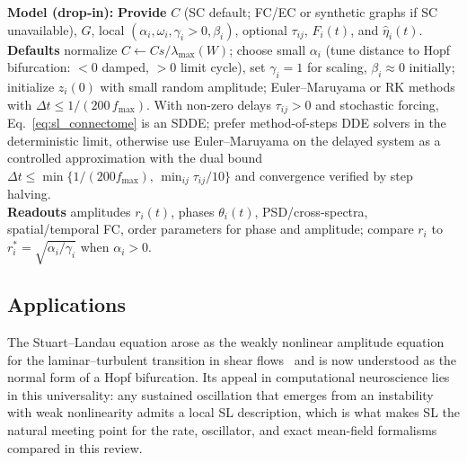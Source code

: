 \documentclass[12pt]{article}
\numberwithin{equation}{section}
\newcommand{\rev}[1]{\begingroup\color{navyblue}#1\endgroup}
\begin{document}
\begin{tcolorbox}[
  colback=gray!5,
  colframe=slate,
  colbacktitle=softblue!25,
  coltitle=softblue!60!black,
  fonttitle=\bfseries\small,
  title={\small How to Use It},
  boxrule=0.4pt, enhanced, sharp corners,
  left=4pt,right=4pt,top=3pt,bottom=3pt,
  boxsep=2pt, before skip=6pt, after skip=6pt
]
\scriptsize
\textbf{Model (drop‑in):}
\textbf{Provide} $C$ (SC default; FC/EC or synthetic graphs if SC unavailable), $G$, local $(\alpha_i,\omega_i,\gamma_i>0,\beta_i)$, optional $\tau_{ij}$, $F_i(t)$, and $\hat \eta_i(t)$.\\
\textbf{Defaults} normalize $
C\!\leftarrow\!Cs /\lambda_{\max}(W)$; choose small $\alpha_i$ (tune distance to Hopf bifurcation: $<0$ damped, $>0$ limit cycle), set $\gamma_i{=}1$ for scaling, $\beta_i\approx 0$ initially; initialize $z_i(0)$ with small random amplitude; Euler–Maruyama or RK methods with $\Delta t\!\le\!1/(200\,f_{\max})$. \rev{With non-zero delays $\tau_{ij}>0$ and stochastic forcing, Eq.~\eqref{eq:sl_connectome} is an SDDE; prefer method-of-steps DDE solvers in the deterministic limit, otherwise use Euler--Maruyama on the delayed system as a controlled approximation with the dual bound $\Delta t \le \min\{1/(200 f_{\max}),\,\min_{ij}\tau_{ij}/10\}$ and convergence verified by step halving.}\\
\textbf{Readouts} amplitudes $r_i(t)$, phases $\theta_i(t)$, PSD/cross‑spectra, spatial/temporal FC, order parameters for phase and amplitude; compare $r_i$ to $r_i^{*}=\sqrt{\alpha_i/\gamma_i}$ when $\alpha_i>0$.
\end{tcolorbox}

\subsection{Applications}


\rev{The Stuart--Landau equation arose as the weakly nonlinear amplitude equation for the laminar--turbulent transition in shear flows~\cite{Landau1944,Stuart1958,Stuart1960} and is now understood as the normal form of a Hopf bifurcation. Its appeal in computational neuroscience lies in this universality: any sustained oscillation that emerges from an instability with weak nonlinearity admits a local SL description, which is what makes SL the natural meeting point for the rate, oscillator, and exact mean-field formalisms compared in this review.}
\end{document}
